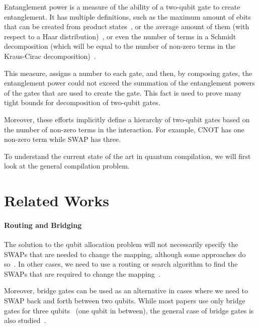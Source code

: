 \documentclass{report}
\begin{document}
Entanglement power is a measure of the ability of a two-qubit gate to create entanglement. It has multiple definitions, such as the maximum amount of ebits that can be created from product states~\cite{shen2018}, or the average amount of them (with respect to a Haar distribution)~\cite{zanardi2000}, or even the number of terms in a Schmidt decomposition (which will be equal to the number of non-zero terms in the Kraus-Cirac decomposition)~\cite{nielsen2003}.

This measure, assigns a number to each gate, and then, by composing gates, the entanglement power could not exceed the summation of the entanglement powers of the gates that are used to create the gate. This fact is used to prove many tight bounds for decomposition of two-qubit gates.

Moreover, these efforts implicitly define a hierarchy of two-qubit gates based on the number of non-zero terms in the interaction. For example, CNOT has one non-zero term while SWAP has three.

To understand the current state of the art in quantum compilation, we will first look at the general compilation problem. 


\chapter{Related Works}\label{chap:discussion}

\subsubsection{Routing and Bridging}



The solution to the qubit allocation problem will not necessarily specify the SWAPs that are needed to change the mapping, although some approaches do so~\cite{childs, li2019, zhou2020}. In other cases, we need to use a routing or search algorithm to find the SWAPs that are required to change the mapping~\cite{zulehner2018, sivarajah2021}.

Moreover, bridge gates can be used as an alternative in cases where we need to SWAP back and forth between two qubits. While most papers use only bridge gates for three qubits~\cite{sivarajah2021,itoko2019,shende2006,siraichi2018} (one qubit in between), the general case of bridge gates is also studied~\cite{zhou2020, nash2020}.
\end{document}
